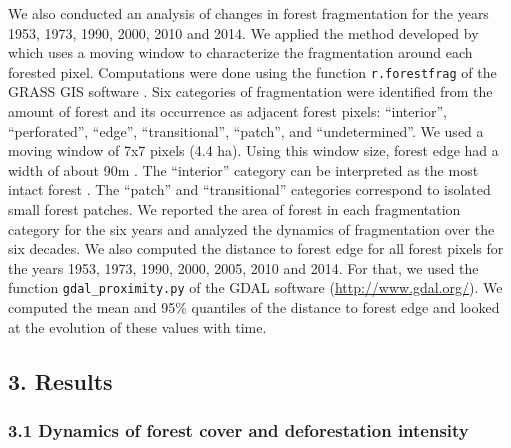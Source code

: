 \documentclass[]{article}
\begin{document}
We also conducted an analysis of changes in forest fragmentation for the
years 1953, 1973, 1990, 2000, 2010 and 2014. We applied the method
developed by \citet{Riitters2000} which uses a moving window to
characterize the fragmentation around each forested pixel. Computations
were done using the function \texttt{r.forestfrag} of the GRASS GIS
software \citep{Neteler2008}. Six categories of fragmentation were
identified from the amount of forest and its occurrence as adjacent
forest pixels: ``interior'', ``perforated'', ``edge'', ``transitional'',
``patch'', and ``undetermined''. We used a moving window of 7x7 pixels
(4.4 ha). Using this window size, forest edge had a width of about 90m
\citep{Riitters2000}. The ``interior'' category can be interpreted as
the most intact forest \citep{Potapov2017}. The ``patch'' and
``transitional'' categories correspond to isolated small forest patches.
We reported the area of forest in each fragmentation category for the
six years and analyzed the dynamics of fragmentation over the six
decades. We also computed the distance to forest edge for all forest
pixels for the years 1953, 1973, 1990, 2000, 2005, 2010 and 2014. For
that, we used the function \texttt{gdal\_proximity.py} of the GDAL
software (\url{http://www.gdal.org/}). We computed the mean and 95\%
quantiles of the distance to forest edge and looked at the evolution of
these values with time.

\hypertarget{results}{%
\subsection{3. Results}\label{results}}

\hypertarget{dynamics-of-forest-cover-and-deforestation-intensity}{%
\subsubsection{3.1 Dynamics of forest cover and deforestation
intensity}\label{dynamics-of-forest-cover-and-deforestation-intensity}}
\end{document}
